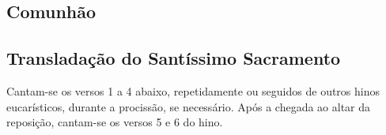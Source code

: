 \AllowPageFlush

\subsection{Comunhão}\label{subsection:hebdomada-sancta/missa-in-cena-domini/psalmi-ad-communionem}

\AllowPageFlush

\subsection{Transladação do Santíssimo Sacramento}\label{subsection:hebdomada-sancta/missa-in-cena-domini/hymnus-ad-translatione-ssmi-sacramenti}
\begin{rubrica}
  Cantam-se os versos 1 a 4 abaixo, repetidamente ou seguidos de outros hinos eucarísticos, durante a procissão, se necessário. Após a chegada ao altar da reposição, cantam-se os versos 5 e 6 do hino.
\end{rubrica}
